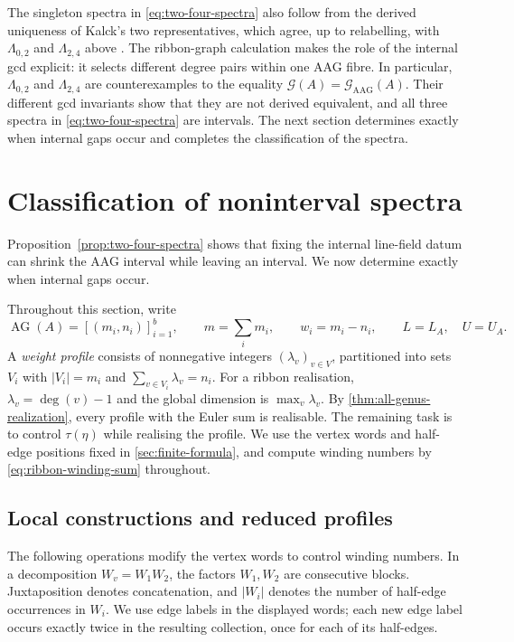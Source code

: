 \documentclass[11pt]{amsart}
\theoremstyle{definition}
\theoremstyle{plain}
\theoremstyle{definition}
\theoremstyle{definition}
\newcommand{\AG}{\operatorname{AG}}
\newcommand{\GSpec}{\mathcal G}
\newcommand{\AGSpec}{\mathcal G_{\mathrm{AAG}}}
\begin{document}
The singleton spectra in \eqref{eq:two-four-spectra} also follow from the
derived uniqueness of Kalck's two representatives, which agree, up to
relabelling, with $\Lambda_{0,2}$ and $\Lambda_{2,4}$ above
\cite[Corollary~4.7]{KalckDerivedUnique}.  The ribbon-graph calculation makes the role of the internal gcd explicit:
it selects different degree pairs within one AAG fibre.  In particular,
$\Lambda_{0,2}$ and $\Lambda_{2,4}$ are counterexamples to the equality
$\GSpec(A)=\AGSpec(A)$.  Their different gcd invariants show that they
are not derived equivalent, and all three spectra in
\eqref{eq:two-four-spectra} are intervals. The next section determines exactly when internal gaps occur
and completes the classification of the spectra.


\section{Classification of noninterval spectra}
\label{sec:spectrum-classification}

Proposition~\ref{prop:two-four-spectra} shows that fixing the
internal line-field datum can shrink the AAG interval while
leaving an interval.  We now determine exactly when internal
gaps occur.  

Throughout this section, write
\[
 \AG(A)=[(m_i,n_i)]_{i=1}^b,\qquad
 m=\sum_i m_i,\qquad w_i=m_i-n_i,
 \qquad L=L_A,\quad U=U_A.
\]
A \emph{weight profile} consists of nonnegative integers
$(\lambda_v)_{v\in V}$, partitioned into sets $V_i$ with
$|V_i|=m_i$ and $\sum_{v\in V_i}\lambda_v=n_i$.
For a ribbon realisation, $\lambda_v=\deg(v)-1$ and the global dimension
is $\max_v\lambda_v$.  By \cref{thm:all-genus-realization}, every profile
with the Euler sum is realisable.  The remaining task is to control
$\tau(\eta)$ while realising the profile.  We use the vertex
words and half-edge positions fixed
in \cref{sec:finite-formula}, and compute winding numbers by
\eqref{eq:ribbon-winding-sum} throughout.

\subsection{Local constructions and reduced profiles}
\label{subsec:classification-constructions}

The following operations modify the vertex words to control
winding numbers.  In a decomposition $W_v=W_1W_2$, the factors
$W_1,W_2$ are consecutive blocks.
Juxtaposition denotes concatenation, and $|W_i|$ denotes the
number of half-edge occurrences in $W_i$.
We use edge labels in the displayed words; each new edge label
occurs exactly twice in the resulting collection, once for
each of its half-edges.
\end{document}
